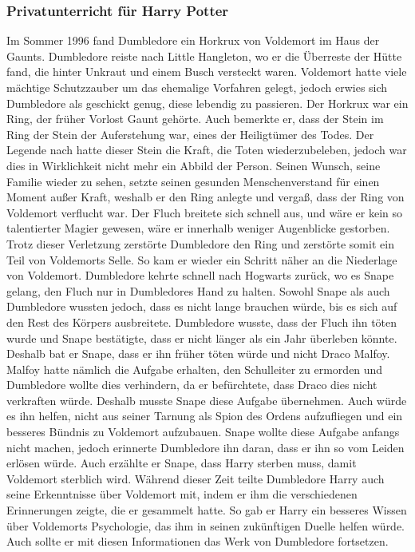 \documentclass[a4paper, 10pt]{article}
\begin{document}
\subsubsection*{Privatunterricht für Harry Potter}
Im Sommer 1996 fand Dumbledore ein Horkrux von Voldemort im Haus der Gaunts. Dumbledore reiste nach Little Hangleton, wo er die Überreste der Hütte fand, die hinter Unkraut und einem Busch versteckt waren. Voldemort hatte viele mächtige Schutzzauber um das ehemalige Vorfahren gelegt, jedoch erwies sich Dumbledore als geschickt genug, diese lebendig zu passieren. Der Horkrux war ein Ring, der früher Vorlost Gaunt gehörte. Auch bemerkte er, dass der Stein im Ring der Stein der Auferstehung war, eines der Heiligtümer des Todes.
\vspace{10pt}
\newline
{}  
Der Legende nach hatte dieser Stein die Kraft, die Toten wiederzubeleben, jedoch war dies in Wirklichkeit nicht mehr ein Abbild der Person. Seinen Wunsch, seine Familie wieder zu sehen, setzte seinen gesunden Menschenverstand für einen Moment außer Kraft, weshalb er den Ring anlegte und vergaß, dass der Ring von Voldemort verflucht war. Der Fluch breitete sich schnell aus, und wäre er kein so talentierter Magier gewesen, wäre er innerhalb weniger Augenblicke gestorben. Trotz dieser Verletzung zerstörte Dumbledore den Ring und zerstörte somit ein Teil von Voldemorts Selle. So kam er wieder ein Schritt näher an die Niederlage von Voldemort.
\vspace{10pt}
\newline
{}  
Dumbledore kehrte schnell nach Hogwarts zurück, wo es Snape gelang, den Fluch nur in Dumbledores Hand zu halten. Sowohl Snape als auch Dumbledore wussten jedoch, dass es nicht lange brauchen würde, bis es sich auf den Rest des Körpers ausbreitete. Dumbledore wusste, dass der Fluch ihn töten wurde und Snape bestätigte, dass er nicht länger als ein Jahr überleben könnte. Deshalb bat er Snape, dass er ihn früher töten würde und nicht Draco Malfoy. Malfoy hatte nämlich die Aufgabe erhalten, den Schulleiter zu ermorden und Dumbledore wollte dies verhindern, da er befürchtete, dass Draco dies nicht verkraften würde. Deshalb musste Snape diese Aufgabe übernehmen. Auch würde es ihn helfen, nicht aus seiner Tarnung als Spion des Ordens aufzufliegen und ein besseres Bündnis zu Voldemort aufzubauen. Snape wollte diese Aufgabe anfangs nicht machen, jedoch erinnerte Dumbledore ihn daran, dass er ihn so vom Leiden erlösen würde. Auch erzählte er Snape, dass Harry sterben muss, damit Voldemort sterblich wird. Während dieser Zeit teilte Dumbledore Harry auch seine Erkenntnisse über Voldemort mit, indem er ihm die verschiedenen Erinnerungen zeigte, die er gesammelt hatte. So gab er Harry ein besseres Wissen über Voldemorts Psychologie, das ihm in seinen zukünftigen Duelle helfen würde. Auch sollte er mit diesen Informationen das Werk von Dumbledore fortsetzen.
\end{document}
